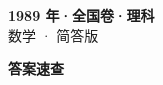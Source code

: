 \documentclass[zihao=-4, a4paper]{ctexart}
\begin{document}
\begin{center}
  {\Large\bfseries 1989 年·全国卷·理科}\\[4pt]
  {\large 数学 · 简答版}
\end{center}
\medskip
{}

\clearpage
{}
\begin{center}{\Large\bfseries 答案速查}\end{center}
\medskip

\end{document}
